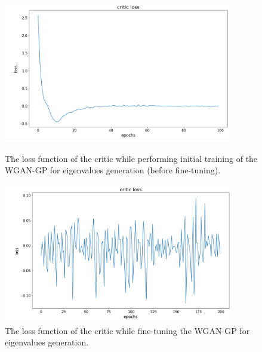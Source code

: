 \documentclass{article}
\begin{document}
\begin{figure}
    \centering
    \begin{minipage}{0.45\textwidth}
        \includegraphics[width=0.9\textwidth]{../figs/evals_wgangp_loss.png}    
    \caption{The loss function of the critic while performing initial training of the WGAN-GP for eigenvalues generation (before fine-tuning).}
    \label{fig:evals_wgangp_loss}
    \end{minipage}\hfill
    \begin{minipage}{0.45\textwidth}
        \includegraphics[width=0.9\textwidth]{../figs/evals_loss_after_finetuning.png}    
    \caption{The loss function of the critic while fine-tuning the WGAN-GP for eigenvalues generation.}
    \label{fig:evals_loss_after_finetuning}
    \end{minipage}
\end{figure}
\end{document}
